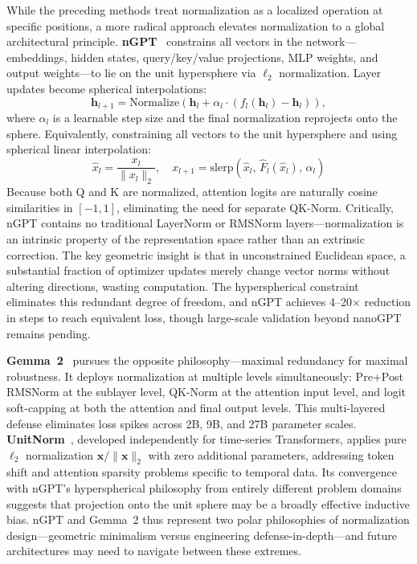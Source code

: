While the preceding methods treat normalization as a localized operation at specific positions, a more radical approach elevates normalization to a global architectural principle.
\textbf{nGPT}~\cite{loshchilov2024ngpt} constrains all vectors in the network---embeddings, hidden states, query/key/value projections, MLP weights, and output weights---to lie on the unit hypersphere via $\ell_2$ normalization.
Layer updates become spherical interpolations:
\begin{equation}
    \mathbf{h}_{l+1} = \text{Normalize}\!\left(\mathbf{h}_l + \alpha_l \cdot \left(f_l(\mathbf{h}_l) - \mathbf{h}_l\right)\right),
\end{equation}
where $\alpha_l$ is a learnable step size and the final normalization reprojects onto the sphere.
Equivalently, constraining all vectors to the unit hypersphere and using spherical linear interpolation:
\begin{equation}
\hat{x}_l = \frac{x_l}{\|x_l\|_2}, \quad x_{l+1} = \mathrm{slerp}\!\left(\hat{x}_l,\, \hat{F}_l(\hat{x}_l),\, \alpha_l\right)
\label{eq:ngpt}
\end{equation}
Because both Q and K are normalized, attention logits are naturally cosine similarities in $[-1, 1]$, eliminating the need for separate QK-Norm.
Critically, nGPT contains no traditional LayerNorm or RMSNorm layers---normalization is an intrinsic property of the representation space rather than an extrinsic correction.
The key geometric insight is that in unconstrained Euclidean space, a substantial fraction of optimizer updates merely change vector norms without altering directions, wasting computation.
The hyperspherical constraint eliminates this redundant degree of freedom, and nGPT achieves 4--20$\times$ reduction in steps to reach equivalent loss, though large-scale validation beyond nanoGPT remains pending.

\textbf{Gemma~2}~\cite{gemma2024improving} pursues the opposite philosophy---maximal redundancy for maximal robustness.
It deploys normalization at multiple levels simultaneously: Pre+Post RMSNorm at the sublayer level, QK-Norm at the attention input level, and logit soft-capping at both the attention and final output levels.
This multi-layered defense eliminates loss spikes across 2B, 9B, and 27B parameter scales.
\textbf{UnitNorm}~\cite{zhao2024unitnorm}, developed independently for time-series Transformers, applies pure $\ell_2$ normalization $\mathbf{x}/\|\mathbf{x}\|_2$ with zero additional parameters, addressing token shift and attention sparsity problems specific to temporal data.
Its convergence with nGPT's hyperspherical philosophy from entirely different problem domains suggests that projection onto the unit sphere may be a broadly effective inductive bias.
nGPT and Gemma~2 thus represent two polar philosophies of normalization design---geometric minimalism versus engineering defense-in-depth---and future architectures may need to navigate between these extremes.

